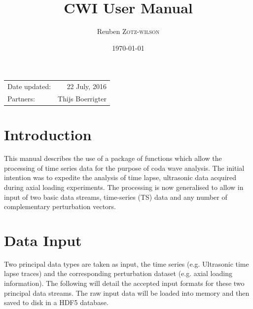 \documentclass{article}
\title{CWI User Manual} %
\author{Reuben \textsc{Zotz-wilson}} %
\date{\today} %
\begin{document}
\maketitle %

\begin{center}
\begin{tabular}{l r}
Date updated: & 22 July, 2016 \\ %
Partners: & Thijs Boerrigter \\ %
\end{tabular}
\end{center}



\section{Introduction}

This manual describes the use of a package of functions which allow the processing of time series data for the purpose of coda wave analysis. The initial intention was to expedite the analysis of time lapse, ultrasonic data acquired during axial loading experiments. The processing is now generalised to allow in input of two basic data streams, time-series (TS) data and any number of complementary perturbation vectors.
 

\section{Data Input}
Two principal data types are taken as input, the time series (e.g. Ultrasonic time lapse traces) and the corresponding perturbation dataset (e.g. axial loading information). The following will detail the accepted input formats for these two principal data streams. The raw input data will be loaded into memory and then saved to disk in a HDF5 database. 
\end{document}
